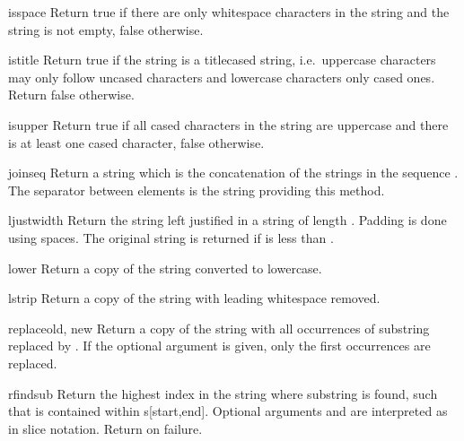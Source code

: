 \begin{methoddesc}[string]{isspace}{}
Return true if there are only whitespace characters in the string and
the string is not empty, false otherwise.
\end{methoddesc}

\begin{methoddesc}[string]{istitle}{}
Return true if the string is a titlecased string, i.e.\ uppercase
characters may only follow uncased characters and lowercase characters
only cased ones.  Return false otherwise.
\end{methoddesc}

\begin{methoddesc}[string]{isupper}{}
Return true if all cased characters in the string are uppercase and
there is at least one cased character, false otherwise.
\end{methoddesc}

\begin{methoddesc}[string]{join}{seq}
Return a string which is the concatenation of the strings in the
sequence .  The separator between elements is the string
providing this method.
\end{methoddesc}

\begin{methoddesc}[string]{ljust}{width}
Return the string left justified in a string of length .
Padding is done using spaces.  The original string is returned if
 is less than .
\end{methoddesc}

\begin{methoddesc}[string]{lower}{}
Return a copy of the string converted to lowercase.
\end{methoddesc}

\begin{methoddesc}[string]{lstrip}{}
Return a copy of the string with leading whitespace removed.
\end{methoddesc}

\begin{methoddesc}[string]{replace}{old, new}
Return a copy of the string with all occurrences of substring
 replaced by .  If the optional argument
 is given, only the first  occurrences are
replaced.
\end{methoddesc}

\begin{methoddesc}[string]{rfind}{sub }
Return the highest index in the string where substring  is
found, such that  is contained within s[start,end].  Optional
arguments  and  are interpreted as in slice
notation.  Return  on failure.
\end{methoddesc}

